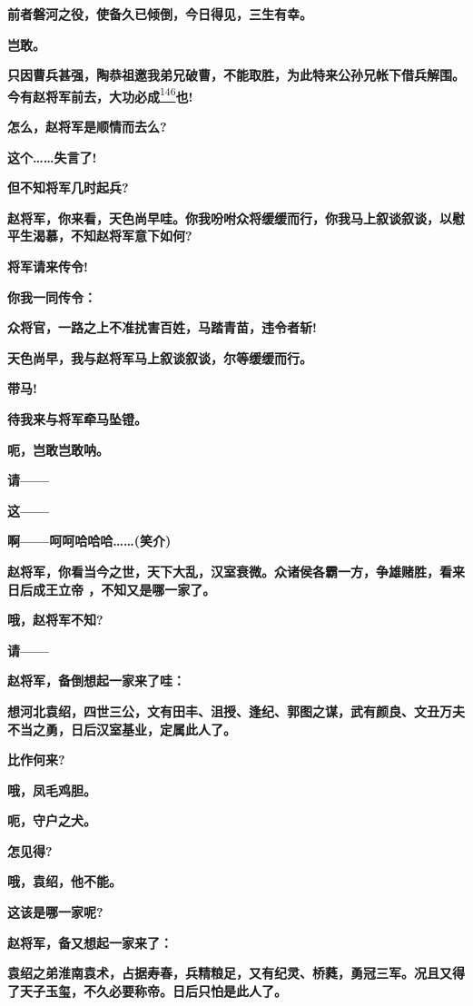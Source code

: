 \textbf{前者磐河之役，使备久已倾倒，今日得见，三生有幸。}

\textbf{岂敢。}

\textbf{只因曹兵甚强，陶恭祖邀我弟兄破曹，不能取胜，为此特来公孙兄帐下借兵解围。今有赵将军前去，大功必成}\protect\hyperlink{fn146}{\textsuperscript{146}}\textbf{也!}

\textbf{怎么，赵将军是顺情而去么?}

\textbf{这个\ldots{}\ldots{}失言了!}

\textbf{但不知将军几时起兵?}

\textbf{赵将军，你来看，天色尚早哇。你我吩咐众将缓缓而行，你我马上叙谈叙谈，以慰平生渴慕，不知赵将军意下如何?}

\textbf{将军请来传令!}

\textbf{你我一同传令：}

\textbf{众将官，一路之上不准扰害百姓，马踏青苗，违令者斩!}

\textbf{天色尚早，我与赵将军马上叙谈叙谈，尔等缓缓而行。}

\textbf{带马!}

\textbf{待我来与将军牵马坠镫。}

\textbf{呃，岂敢岂敢呐。}

\textbf{请------}

\textbf{这------}

\textbf{啊------呵呵哈哈哈\ldots{}\ldots{}(笑介)}

\textbf{赵将军，你看当今之世，天下大乱，汉室衰微。众诸侯各霸一方，争雄赌胜，看来日后成王立帝
，不知又是哪一家了。}

\textbf{哦，赵将军不知?}

\textbf{请------}

\textbf{赵将军，备倒想起一家来了哇：}

\textbf{想河北袁绍，四世三公，文有田丰、沮授、逢纪、郭图之谋，武有颜良、文丑万夫不当之勇，日后汉室基业，定属此人了。}

\textbf{比作何来?}

\textbf{哦，凤毛鸡胆。}

\textbf{呃，守户之犬。}

\textbf{怎见得?}

\textbf{哦，袁绍，他不能。}

\textbf{这该是哪一家呢?}

\textbf{赵将军，备又想起一家来了：}

\textbf{袁绍之弟淮南袁术，占据寿春，兵精粮足，又有纪灵、桥蕤，勇冠三军。况且又得了天子玉玺，不久必要称帝。日后只怕是此人了。}

